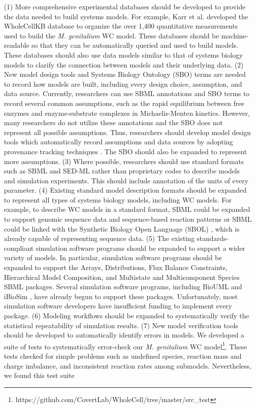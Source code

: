 \documentclass[journal,transmag,twoside]{IEEEtran}
\begin{document}
(1) More comprehensive experimental databases should be developed to provide the data needed to build systems models.  For example, Karr et al. developed the WholeCellKB database \cite{karr2013wholecellkb} to organize the over 1,400 
quantitative measurements used to build the \textit{M. genitalium} WC model. These databases should be machine-readable 
so that they can be automatically queried and used to build models. These databases should also use data models similar to that of systems biology models to clarify the connection between models and their underlying data. (2) New model design tools and Systems Biology Ontology (SBO) \cite{juty2013systems} terms are needed to record how models are built, including every design choice, assumption, and data source. Currently, researchers can use SBML annotations and SBO terms to record several common assumptions, such as the rapid equilibrium between free enzymes and enzyme-substrate complexes in Michaelis-Menten kinetics. However, many researchers do not utilize these annotations and the SBO does not represent all possible assumptions. Thus, researchers should develop model design tools which automatically record assumptions and data sources by adopting provenance tracking techniques \cite{callahan2006vistrails, hillman2012using, oinn2004taverna}. The SBO should also be expanded to represent more assumptions. (3) Where possible, researchers should use standard formats such as SBML and SED-ML rather than proprietary codes to describe models and simulation experiments. This should include annotation of the units of every parameter. (4) Existing standard model description formats should be expanded to represent all types of systems biology models, including WC models. For example, to describe WC models in a standard format, SBML could be expanded to support genomic sequence data and sequence-based reaction patterns or SBML could be linked with the Synthetic Biology Open Language (SBOL) \cite{galdzicki2014synthetic}, which is already capable of representing sequence data. (5) The existing standards-compliant simulation software programs should be expanded to support a wider variety of models. In particular, simulation software programs should be expanded to support the Arrays, Distributions, Flux Balance Constraints, Hierarchical Model Composition, and Multistate and Multicomponent Species SBML packages. Several simulation software programs, including BioUML \cite{Kolpakov2006} and iBioSim \cite{Stevens2013}, have already begun to support these packages. Unfortunately, most simulation software developers have insufficient funding to implement every package. (6) Modeling workflows should be expanded to systematically verify the statistical repeatability of simulation results. (7) New model verification tools should be developed to automatically identify errors in models. We developed a suite of tests to systematically error-check our \textit{M. genitalium} WC model\footnote{https://github.com/CovertLab/WholeCell/tree/master/src\_test}. These tests checked for simple problems such as undefined species, reaction mass and charge imbalance, and inconsistent reaction rates among submodels. Nevertheless, we found this test suite 
\end{document}
